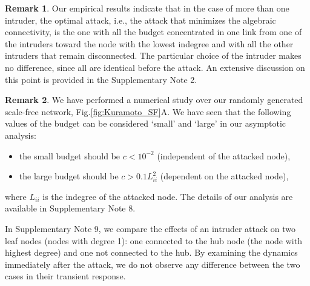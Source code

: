 \documentclass[%
 reprint,
 amsmath,amssymb,
 aip,
]{revtex4-2}
\theoremstyle{italichead}
\theoremstyle{definition}
\newtheorem{remark}{Remark}
\begin{document}
{



\begin{remark}
    Our empirical results indicate that in the case of more than one intruder, the optimal attack, i.e., the attack that minimizes the algebraic connectivity, is the one with all the budget concentrated in one link from one of the intruders toward the node with the lowest indegree and with all the other intruders that remain disconnected.
    The particular choice of the intruder makes no difference, since all are identical before the attack.
    An extensive discussion on this point is provided in the Supplementary Note 2.
\end{remark}
\begin{remark}
    We have performed a numerical study over our randomly generated scale-free network, Fig.\ref{fig:Kuramoto_SF}A.
    We have seen that the following values of the budget can be considered `small' and `large' in our asymptotic analysis:
    \begin{itemize}
        \item the small budget should be $c < 10^{-2}$ (independent of the attacked node), 
        \item the large budget should be $c > 0.1 L_{ii}^2$ (dependent on the attacked node),
    \end{itemize}
    where $L_{ii}$ is the indegree of the attacked node.
    The details of our analysis are available in Supplementary Note 8.
\end{remark}


In Supplementary Note 9, we compare the effects of an intruder attack on two leaf nodes (nodes with degree 1): one connected to the hub node (the node with highest degree) and one not connected to the hub. By examining the dynamics immediately after the attack, we do not observe any difference between the two cases in their transient response.
\color{black}

}
\end{document}
